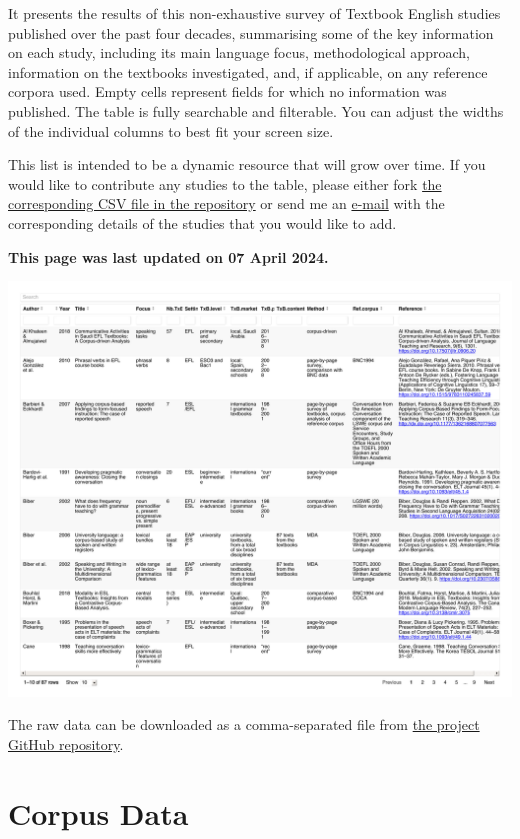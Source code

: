 \documentclass[
  letterpaper,
  DIV=11,
  numbers=noendperiod]{scrreprt}
\begin{document}
It presents the results of this non-exhaustive survey of Textbook
English studies published over the past four decades, summarising some
of the key information on each study, including its main language focus,
methodological approach, information on the textbooks investigated, and,
if applicable, on any reference corpora used. Empty cells represent
fields for which no information was published. The table is fully
searchable and filterable. You can adjust the widths of the individual
columns to best fit your screen size.

This list is intended to be a dynamic resource that will grow over time.
If you would like to contribute any studies to the table, please either
fork
\href{https://github.com/elenlefoll/TextbookEnglish/blob/main/LitReviewTable.csv}{the
corresponding CSV file in the repository} or send me an
\href{mailto:elefoll@uni-koeln.de?subject=\%5BLitReviewTable\%5D\%20Suggestions}{e-mail}
with the corresponding details of the studies that you would like to
add.

\textbf{This page was last updated on 07 April 2024.}

\includegraphics{AppendixA_files/figure-pdf/display-1.pdf}

The raw data can be downloaded as a comma-separated file from
\href{https://github.com/elenlefoll/TextbookMDA}{the project GitHub
repository}.

\chapter{Corpus Data}\label{corpus-data}
\end{document}
